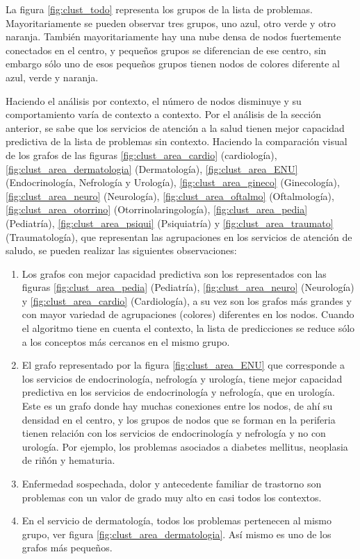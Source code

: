 La figura \ref{fig:clust_todo} representa los grupos de la lista de problemas. Mayoritariamente se pueden observar tres grupos, uno azul, otro verde y otro naranja. También mayoritariamente hay una nube densa de nodos fuertemente conectados en el centro, y pequeños grupos se diferencian de ese centro, sin embargo sólo uno de esos pequeños grupos tienen nodos de colores diferente al azul, verde y naranja.

Haciendo el análisis por contexto, el número de nodos disminuye y su comportamiento varía de contexto a contexto. Por el análisis de la sección anterior, se sabe que los servicios de atención a la salud tienen mejor capacidad predictiva de la lista de problemas sin contexto. Haciendo la comparación visual de los grafos de las figuras \ref{fig:clust_area_cardio} (cardiología), \ref{fig:clust_area_dermatologia} (Dermatología), \ref{fig:clust_area_ENU} (Endocrinología, Nefrología y Urología), \ref{fig:clust_area_gineco} (Ginecología), \ref{fig:clust_area_neuro} (Neurología), \ref{fig:clust_area_oftalmo} (Oftalmología), \ref{fig:clust_area_otorrino} (Otorrinolaringología), \ref{fig:clust_area_pedia} (Pediatría), \ref{fig:clust_area_psiqui} (Psiquiatría) y \ref{fig:clust_area_traumato} (Traumatología), que representan las agrupaciones en los servicios de atención de saludo, se pueden realizar las siguientes observaciones:

\begin{enumerate}
\item Los grafos con mejor capacidad predictiva son los representados con las figuras \ref{fig:clust_area_pedia} (Pediatría), \ref{fig:clust_area_neuro} (Neurología) y \ref{fig:clust_area_cardio} (Cardiología), a su vez son los grafos más grandes y con mayor variedad de agrupaciones (colores) diferentes en los nodos. Cuando el algoritmo tiene en cuenta el contexto, la lista de predicciones se reduce sólo a los conceptos más cercanos en el mismo grupo.
\item El grafo representado por la figura \ref{fig:clust_area_ENU} que corresponde a los servicios de endocrinología, nefrología y urología, tiene mejor capacidad predictiva en los servicios de endocrinología y nefrología, que en urología. Este es un grafo donde hay muchas conexiones entre los nodos, de ahí su densidad en el centro, y los grupos de nodos que se forman en la periferia tienen relación con los servicios de endocrinología y nefrología y no con urología. Por ejemplo, los problemas asociados a diabetes mellitus, neoplasia de riñón y hematuria.
\item Enfermedad sospechada, dolor y antecedente familiar de trastorno son problemas con un valor de grado muy alto en casi todos los contextos.
\item En el servicio de dermatología, todos los problemas pertenecen al mismo grupo, ver figura \ref{fig:clust_area_dermatologia}. Así mismo es uno de los grafos más pequeños.
\end{enumerate}

